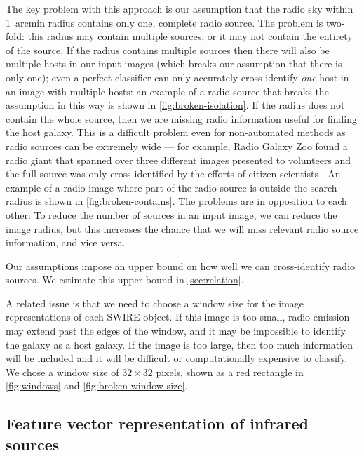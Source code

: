 \documentclass[fleqn,usenatbib,usedcolumn]{mnras}
\begin{document}
    The key problem with this approach is our assumption that the radio sky
    within 1~arcmin radius contains only one, complete radio source. The
    problem is two-fold: this radius may contain multiple sources, or it may
    not contain the entirety of the source. If the radius contains multiple
    sources then there will also be multiple hosts in our input images (which
    breaks our assumption that there is only one); even a perfect classifier
    can only accurately cross-identify \emph{one} host in an image with
    multiple hosts: an example of a radio source that breaks the assumption in
    this way is shown in \autoref{fig:broken-isolation}. If the radius does
    not contain the whole source, then we are missing radio information useful
    for finding the host galaxy. This is a difficult problem even for
    non-automated methods as radio sources can be extremely wide --- for
    example, Radio Galaxy Zoo found a radio giant that spanned over three
    different images presented to volunteers and the full source was only
    cross-identified by the efforts of citizen scientists \citep{banfield15}.
    An example of a radio image where part of the radio source is outside the
    search radius is shown in \autoref{fig:broken-contains}. The problems are
    in opposition to each other: To reduce the number of sources in an input
    image, we can reduce the image radius, but this increases the chance that
    we will miss relevant radio source information, and vice versa.

    Our assumptions impose an upper bound on how well we can cross-identify
    radio sources. We estimate this upper bound in \autoref{sec:relation}.

    A related issue is that we need to choose a window size for the image
    representations of each SWIRE object. If this image is too small, radio
    emission may extend past the edges of the window, and it may be impossible
    to identify the galaxy as a host galaxy. If the image is too large, then
    too much information will be included and it will be difficult or
    computationally expensive to classify. We chose a window size of $32
    \times 32$ pixels, shown as a red rectangle in
    \autoref{fig:windows} and \autoref{fig:broken-window-size}.

  \subsection{Feature vector representation of infrared sources}
  \label{vector-representation-of-infrared-sources}
\end{document}
